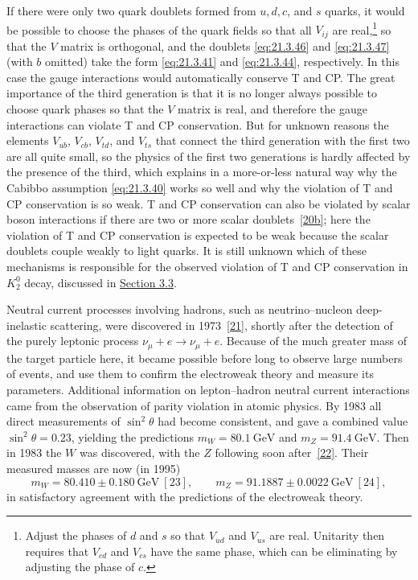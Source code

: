 If there were only two quark doublets formed from $u,d,c$, and $s$ quarks, it would be possible to choose the phases of the quark fields so that all $V_{ij}$ are real,\footnote{Adjust the phases of $d$ and $s$ so that $V_{ud}$ and $V_{us}$ are real. Unitarity then requires that $V_{cd}$ and $V_{cs}$ have the same phase, which can be eliminating by adjusting the phase of $c$.} so that the $V$ matrix is orthogonal, and the doublets \eqref{eq:21.3.46} and \eqref{eq:21.3.47} (with $b$ omitted) take the form \eqref{eq:21.3.41} and \eqref{eq:21.3.44}, respectively. In this case the gauge interactions would automatically conserve T and CP. The great importance of the third generation is that it is no longer always possible to choose quark phases so that the $V$ matrix is real, and therefore the gauge interactions can violate T and CP conservation. But for unknown reasons the elements $V_{ub}$, $V_{cb}$, $V_{td}$, and $V_{ts}$ that connect the third generation with the first two are all quite small, so the physics of the first two generations is hardly affected by the presence of the third, which explains in a more-or-less natural way why the Cabibbo assumption \eqref{eq:21.3.40} works so well and why the violation of T and CP conservation is so weak. T and CP conservation can also be violated by scalar boson interactions if there are two or more scalar doublets~\hyperref[ch21-ref-20b]{[20b]}; here the violation of T and CP conservation is expected to be weak because the scalar doublets couple weakly to light quarks. It is still unknown which of these mechanisms is responsible for the observed violation of T and CP conservation in $K_2^0$ decay, discussed in \hyperref[sec:3.3]{Section 3.3}.

Neutral current processes involving hadrons, such as neutrino--nucleon deep-inelastic scattering, were discovered in 1973~\hyperref[ch21-ref-21]{[21]}, shortly after the detection of the purely leptonic process $\nu_\mu+e\to\nu_\mu+e$. Because of the much greater mass of the target particle here, it became possible before long to observe large numbers of events, and use them to confirm the electroweak theory and measure its parameters. Additional information on lepton--hadron neutral current interactions came from the observation of parity violation in atomic physics. By 1983 all direct measurements of $\sin^2\theta$ had become consistent, and gave a combined value $\sin^2\theta=0.23$, yielding the predictions $m_W=80.1\ \mathrm{GeV}$ and $m_Z=91.4\ \mathrm{GeV}$. Then in 1983 the $W$ was discovered, with the $Z$ following soon after~\hyperref[ch21-ref-22]{[22]}. Their measured masses are now (in 1995)
\[
m_W=80.410\mathbin{\pm}0.180\ \mathrm{GeV}~\hyperref[ch21-ref-23]{[23]},
\qquad
m_Z=91.1887\mathbin{\pm}0.0022\ \mathrm{GeV}~\hyperref[ch21-ref-24]{[24]},
\]
in satisfactory agreement with the predictions of the electroweak theory.

